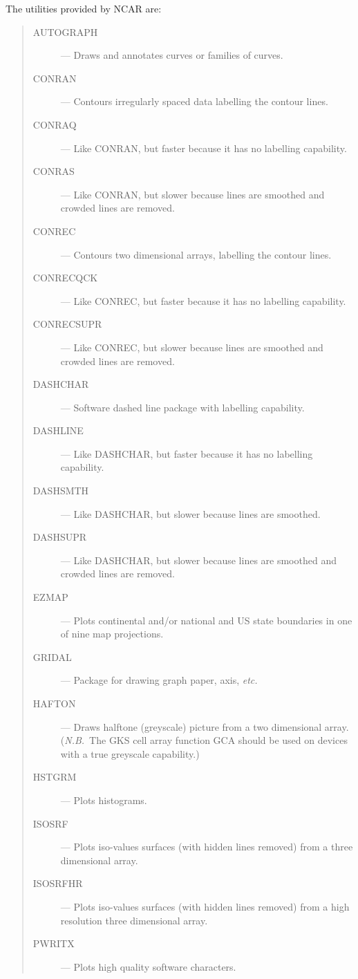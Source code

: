 \documentclass[twoside,11pt]{article}
\renewcommand{\_}{\texttt{\symbol{95}}}
\begin{document}
The utilities provided by NCAR are:

\begin{quote}
\begin{description}
\item [AUTOGRAPH] ---
 Draws and annotates curves or families of curves.
\item [CONRAN] --- 
 Contours irregularly spaced data labelling the contour lines.
\item [CONRAQ] --- 
 Like CONRAN, but faster because it has no labelling capability.
\item [CONRAS] --- 
 Like CONRAN, but slower because lines are smoothed and crowded lines are
 removed.
\item [CONREC] --- 
 Contours two dimensional arrays, labelling the contour lines.
\item [CONRECQCK] --- 
 Like CONREC, but faster because it has no labelling capability.
\item [CONRECSUPR] --- 
 Like CONREC, but slower because lines are smoothed and crowded lines are
 removed.
\item [DASHCHAR] --- 
 Software dashed line package with labelling capability.
\item [DASHLINE] --- 
 Like DASHCHAR, but faster because it has no labelling capability.
\item [DASHSMTH] --- 
 Like DASHCHAR, but slower because lines are smoothed.
\item [DASHSUPR] --- 
 Like DASHCHAR, but slower because lines are smoothed and crowded lines are
 removed.
\item [EZMAP] --- 
 Plots continental and/or national and US state boundaries in one of nine map
 projections.
\item [GRIDAL] --- 
 Package for drawing graph paper, axis, {\em etc.}
\item [HAFTON] --- 
 Draws halftone (greyscale) picture from a two dimensional array.
 ({\em N.B.}\ The GKS cell array function GCA should be used on devices with a
 true greyscale capability.)
\item [HSTGRM] --- 
 Plots histograms.
\item [ISOSRF] --- 
 Plots iso-values surfaces (with hidden lines removed) from a three
 dimensional array.
\item [ISOSRFHR] --- 
 Plots iso-values surfaces (with hidden lines removed) from a high resolution
 three dimensional array.
\item [PWRITX] --- 
 Plots high quality software characters.                      

\end{description}
\end{quote}
\end{document}
